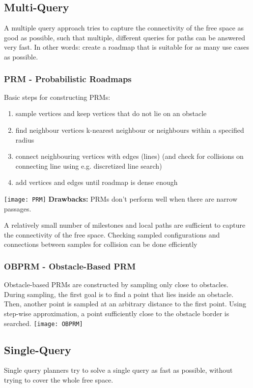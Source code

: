 \begin{multicols*}{2}
\subsection{Multi-Query}
A multiple query approach tries to capture the connectivity of the free space as good as possible, such that multiple, different queries for paths can be answered very fast. In other words: create a roadmap that is suitable for as many use cases as possible.

\subsubsection{PRM - Probabilistic Roadmaps}
Basic steps for constructing PRMs:
\begin{enumerate}
	\item sample vertices and keep vertices that do not lie on an obstacle
	\item find neighbour vertices
		\subitem k-nearest neighbour or
		\subitem neighbours within a specified radius
	\item connect neighbouring vertices with edges (lines) (and check for collisions on connecting line using e.g. discretized line search)
	\item add vertices and edges until roadmap is dense
enough
\end{enumerate}
\texttt{[image: PRM]}
\textbf{Drawbacks: } PRMs don't perform well when there are narrow passages.

A relatively small number of milestones and local paths are sufficient to capture the connectivity of the free space.
Checking sampled configurations and connections between samples for collision can be done efficiently

\subsubsection{OBPRM - Obstacle-Based PRM}
Obstacle-based PRMs are constructed by sampling only close to obstacles. During sampling, the first goal is to find a point that lies inside an obstacle. Then, another point is sampled at an arbitrary distance to the first point. Using step-wise approximation, a point sufficiently close to the obstacle border is searched.
\texttt{[image: OBPRM]}

\subsection{Single-Query}
Single query planners try to solve a single query as fast as possible, without trying to cover the whole free space.


\end{multicols*}
